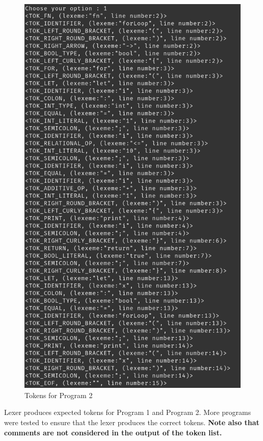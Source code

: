 \begin{itemize}
\begin{figure}[H]
    \includegraphics[scale=0.60]{Task1/output/tokenOutput2.png}
    \caption{Tokens for Program 2}
    \label{fig:tokens for program 2}
\end{figure}
\end{itemize}
{\tiny
Lexer produces expected tokens for Program 1 and Program 2. More programs were tested to ensure that the lexer produces the correct tokens. \textbf{Note also that comments are not considered in the output of the token list.}}